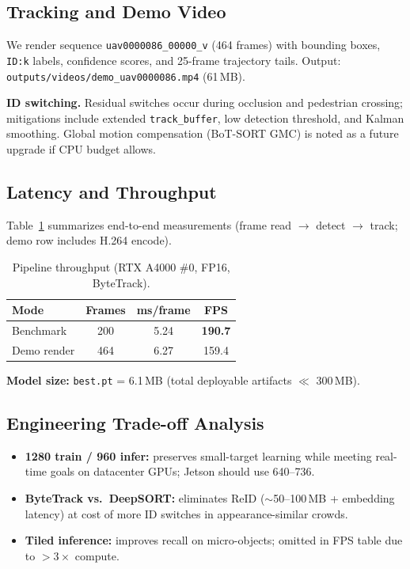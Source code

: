 \documentclass[10pt,twocolumn,letterpaper]{article}
\begin{document}
\subsection{Tracking and Demo Video}
We render sequence \texttt{uav0000086\_00000\_v} (464 frames) with bounding boxes, \texttt{ID:k} labels, confidence scores, and 25-frame trajectory tails. Output: \texttt{outputs/videos/demo\_uav0000086.mp4} (61\,MB).

\textbf{ID switching.} Residual switches occur during occlusion and pedestrian crossing; mitigations include extended \texttt{track\_buffer}, low detection threshold, and Kalman smoothing. Global motion compensation (BoT-SORT GMC) is noted as a future upgrade if CPU budget allows.

\subsection{Latency and Throughput}
Table~\ref{tab:fps} summarizes end-to-end measurements (frame read $\rightarrow$ detect $\rightarrow$ track; demo row includes H.264 encode).

\begin{table}[h]
\centering
\caption{Pipeline throughput (RTX A4000 \#0, FP16, ByteTrack).}
\label{tab:fps}
\small
\begin{tabular}{lccc}
\toprule
Mode & Frames & ms/frame & FPS \\
\midrule
Benchmark & 200 & 5.24 & \textbf{190.7} \\
Demo render & 464 & 6.27 & 159.4 \\
\bottomrule
\end{tabular}
\end{table}

\textbf{Model size:} \texttt{best.pt} = 6.1\,MB (total deployable artifacts $\ll$ 300\,MB).

\subsection{Engineering Trade-off Analysis}
\begin{itemize}[leftmargin=*, nosep]
    \item \textbf{1280 train / 960 infer:} preserves small-target learning while meeting real-time goals on datacenter GPUs; Jetson should use 640--736.
    \item \textbf{ByteTrack vs.\ DeepSORT:} eliminates ReID ($\sim$50--100\,MB + embedding latency) at cost of more ID switches in appearance-similar crowds.
    \item \textbf{Tiled inference:} improves recall on micro-objects; omitted in FPS table due to $>3\times$ compute.
\end{itemize}
\end{document}
